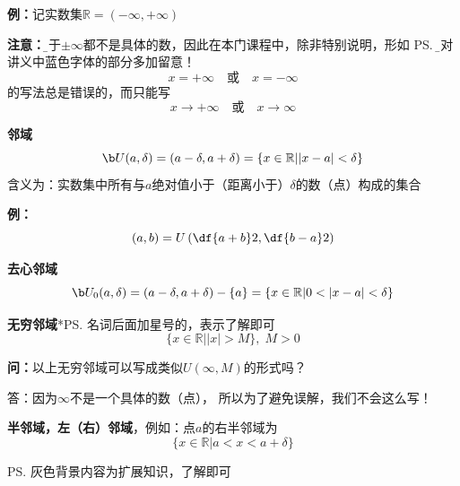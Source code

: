 {\bf 例：}记实数集$\mathbb{R}=(-\infty,+\infty)$

{\bf 注意：}{\b 由于$\pm\infty$都不是具体的数，因此在本门课程中，除非特别说明，形如
\ps{\b 请对讲义中蓝色字体的部分多加留意！}
$$x=+\infty\quad\mbox{或}\quad x=-\infty$$
的写法总是错误的，而只能写
$$x\to+\infty\quad\mbox{或}\quad x\to\infty$$
}

{\bf 邻域}
$${\b U(a,\delta)}=(a-\delta,a+\delta)=\{x\in\mathbb{R}||x-a|<\delta\}$$
含义为：实数集中所有与$a$绝对值小于（距离小于）$\delta$的数（点）构成的集合

{\bf 例：}
$$(a,b)=U\left(\df{a+b}2,\df{b-a}2\right)$$

{\bf 去心邻域}
$${\b
U_0(a,\delta)}=(a-\delta,a+\delta)-\{a\}=\{x\in\mathbb{R}|0<|x-a|<\delta\}$$

{\bf 无穷邻域}*\ps{名词后面加星号的，表示了解即可}
$$\{x\in\mathbb{R}||x|>M\},\;M>0$$

{\bf 问：}以上无穷邻域可以写成类似$U(\infty,M)$的形式吗？

答：因为$\infty$不是一个具体的数（点），
所以为了避免误解，我们不会这么写！

{\bf 半邻域，左（右）邻域}，例如：点$a$的右半邻域为
$$\{x\in\mathbb{R}|a<x<a+\delta\}$$

\ps{灰色背景内容为扩展知识，了解即可}

